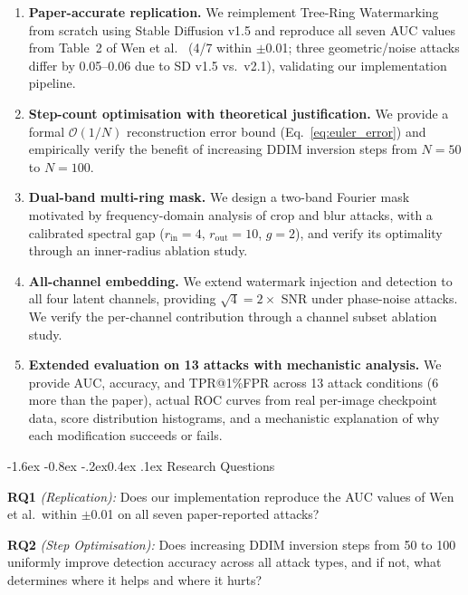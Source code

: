 \documentclass[10pt,twocolumn]{article}
\makeatletter
\renewcommand\subsection{\@startsection{subsection}{2}{\z@}%
  {-1.6ex \@plus -0.8ex \@minus -.2ex}{0.4ex \@plus .1ex}%
  {\normalfont\normalsize\itshape}}
\makeatother
\begin{document}
\begin{enumerate}
  \item \textbf{Paper-accurate replication.}
    We reimplement Tree-Ring Watermarking from scratch using Stable
    Diffusion v1.5 and reproduce all seven AUC values from Table~2 of
    Wen et al.~\cite{wen2023treering} (4/7 within $\pm$0.01; three
    geometric/noise attacks differ by 0.05--0.06 due to SD v1.5 vs.\ v2.1), validating our implementation pipeline.

  \item \textbf{Step-count optimisation with theoretical justification.}
    We provide a formal $\mathcal{O}(1/N)$ reconstruction error bound
    (Eq.~\ref{eq:euler_error}) and empirically verify the benefit of
    increasing DDIM inversion steps from $N{=}50$ to $N{=}100$.

  \item \textbf{Dual-band multi-ring mask.}
    We design a two-band Fourier mask motivated by frequency-domain
    analysis of crop and blur attacks, with a calibrated spectral gap
    ($r_{\mathrm{in}}{=}4$, $r_{\mathrm{out}}{=}10$, $g{=}2$),
    and verify its optimality through an inner-radius ablation study.

  \item \textbf{All-channel embedding.}
    We extend watermark injection and detection to all four latent
    channels, providing $\sqrt{4} = 2\times$ SNR under phase-noise
    attacks. We verify the per-channel contribution through a channel
    subset ablation study.

  \item \textbf{Extended evaluation on 13 attacks with mechanistic analysis.}
    We provide AUC, accuracy, and TPR@1\%FPR across 13 attack conditions
    (6 more than the paper), actual ROC curves from real per-image
    checkpoint data, score distribution histograms, and a mechanistic
    explanation of why each modification succeeds or fails.
\end{enumerate}

\subsection{Research Questions}

\textbf{RQ1} \textit{(Replication):}
Does our implementation reproduce the AUC values of Wen et al.\
within $\pm$0.01 on all seven paper-reported attacks?

\textbf{RQ2} \textit{(Step Optimisation):}
Does increasing DDIM inversion steps from 50 to 100 uniformly improve
detection accuracy across all attack types, and if not, what determines
where it helps and where it hurts?
\end{document}

